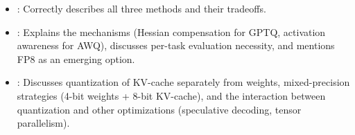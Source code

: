 \begin{interviewq}

\goodgreat
\begin{itemize}
    \item {}: Correctly describes all three methods and their tradeoffs.
    \item {}: Explains the mechanisms (Hessian compensation for GPTQ,
          activation awareness for AWQ), discusses per-task evaluation necessity, and
          mentions FP8 as an emerging option.
    \item {}: Discusses quantization of KV-cache separately from weights,
          mixed-precision strategies (4-bit weights + 8-bit KV-cache), and the
          interaction between quantization and other optimizations (speculative decoding,
          tensor parallelism).
\end{itemize}

\end{interviewq}

\vspace{0.5em}


